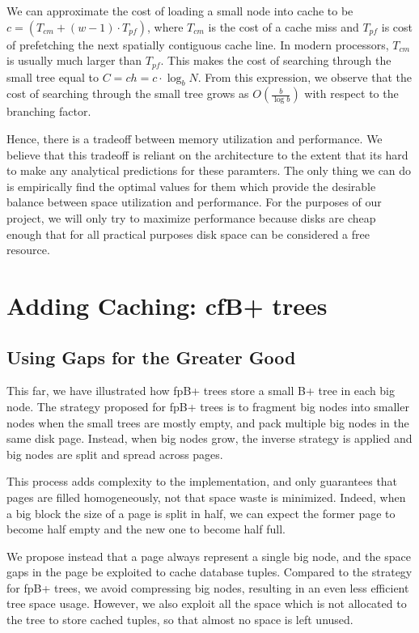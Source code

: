 \documentclass{article}
\begin{document}
We can approximate the cost of loading a small node into cache to be $c =
(T_{cm} + (w-1)\cdot T_{pf})$, where $T_{cm}$ is the cost of a cache miss and
$T_{pf}$ is cost of prefetching the next spatially contiguous cache line. In
modern processors, $T_{cm}$ is usually much larger than $T_{pf}$. This makes the
cost of searching through the small tree equal to $C = ch = c\cdot \log_b N$. From this expression, we 
observe that the cost of searching through the small tree grows as 
$\displaystyle O\left(\frac{b}{\log b}\right)$ with respect to the branching factor.

Hence, there is a tradeoff between memory utilization and performance. We believe that 
this tradeoff is reliant on the architecture to the extent that its hard to make any analytical 
predictions for these paramters. The only thing we can do is  
empirically find the optimal values for them which provide the desirable balance
between space utilization and performance. For the purposes of our project, we will
only try to maximize performance because disks are cheap enough that for all practical purposes
disk space can be considered a free resource.

\section{Adding Caching: cfB+ trees}
\subsection{Using Gaps for the Greater Good}
This far, we have illustrated how fpB+ trees store a small B+ tree in each big
node.
The strategy proposed for fpB+ trees is to fragment big nodes into smaller nodes
when the small trees
are mostly empty, and pack multiple big nodes in the same disk page.
Instead, when big nodes grow, the inverse strategy is applied and big nodes are
split and spread
across pages.

This process adds complexity to the implementation, and only guarantees that
pages are filled
homogeneously, not that space waste is minimized.
Indeed, when a big block the size of a page is split in half,
we can expect the former page to become half empty and the new one to become
half full.

We propose instead that a page always represent a single big node, and the space
gaps in the page
be exploited to cache database tuples.
Compared to the strategy for fpB+ trees, we avoid compressing big nodes,
resulting in an
even less efficient tree space usage.
However, we also exploit all the space which is not allocated to the tree to
store cached tuples,
so that almost no space is left unused.
\end{document}
